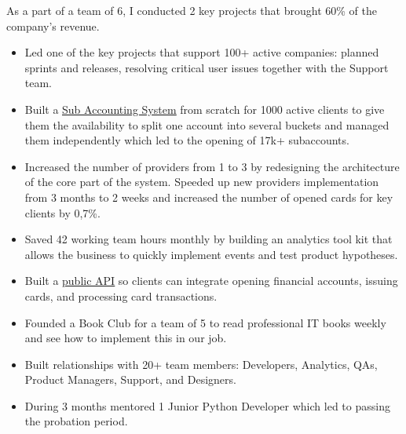 As a part of a team of 6, I conducted 2 key projects that brought 60\% of the company’s revenue.

\begin{itemize}
    \item Led one of the key projects that support 100+ active companies: planned sprints and releases, resolving critical user issues together with the Support team.
    \item Built a \href{https://www.ajot.com/news/karta.io-introduces-a-new-sub-accounts-feature-delivering-an-advanced-money-flow-operation}{\underline{Sub Accounting System}} from scratch for 1000 active clients to give them the availability to split one account into several buckets and managed them independently which led to the opening of 17k+ subaccounts.
    \item Increased the number of providers from 1 to 3 by redesigning the architecture of the core part of the system. Speeded up new providers implementation from 3 months to 2 weeks and increased the number of opened cards for key clients by 0,7\%.
    \item Saved 42 working team hours monthly by building an analytics tool kit that allows the business to quickly implement events and test product hypotheses.
    \item Built a \href{https://karta.io/blog/21-meet-karta-api-growth-engine-for-your-business}{\underline{public API}} so clients can integrate opening financial accounts, issuing cards, and processing card transactions.
    \item Founded a Book Club for a team of 5 to read professional IT books weekly and see how to implement this in our job.
    \item Built relationships with 20+ team members: Developers, Analytics, QAs, Product Managers, Support, and Designers.
    \item During 3 months mentored 1 Junior Python Developer which led to passing the probation period.
\end{itemize}

